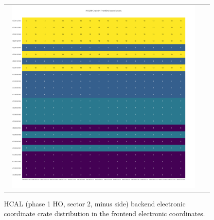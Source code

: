 \begin{figure}[htb]
 \begin{center}
  \begin{tabular}{cc}
   \includegraphics[angle=0,width=0.95\textwidth]{figures/appendix/HO2M_Crate_in_FrontEnd.png}
  \end{tabular}
  \caption{HCAL (phase 1 HO, sector 2, minus side) backend electronic coordinate crate distribution in the frontend electronic coordinates.}
  \label{fig:lmapHO2MCrateFEC}
 \end{center}
\end{figure}
\clearpage

